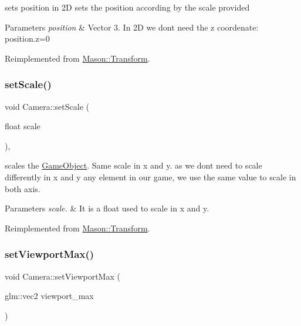sets position in 2D sets the position according by the scale provided 


\begin{DoxyParams}{Parameters}
{\em position} & Vector 3. In 2D we don\textquotesingle{}t need the z coordenate\+: position.\+z=0 \\
\hline
\end{DoxyParams}


Reimplemented from \hyperlink{class_mason_1_1_transform_a740f389e20c0190c52bcb893aeaa0490}{Mason\+::\+Transform}.

\hypertarget{class_mason_1_1_camera_af7aa6752699108d282996199549a704b}{}\label{class_mason_1_1_camera_af7aa6752699108d282996199549a704b} 
\subsubsection{\texorpdfstring{set\+Scale()}{setScale()}}
{\footnotesize\ttfamily void Camera\+::set\+Scale (\begin{DoxyParamCaption}\item[{float}]{scale }\end{DoxyParamCaption})\hspace{0.3cm}{\ttfamily [override]}, {\ttfamily [virtual]}}



scales the \hyperlink{class_mason_1_1_game_object}{Game\+Object}. Same scale in x and y. as we don\textquotesingle{}t need to scale differently in x and y any element in our game, we use the same value to scale in both axis. 


\begin{DoxyParams}{Parameters}
{\em scale.} & It is a float used to scale in x and y. \\
\hline
\end{DoxyParams}


Reimplemented from \hyperlink{class_mason_1_1_transform_a498d685b66e2f73b88d3583ce55461c8}{Mason\+::\+Transform}.

\hypertarget{class_mason_1_1_camera_a1f9a7896bb617d1402e3c4738324e1ea}{}\label{class_mason_1_1_camera_a1f9a7896bb617d1402e3c4738324e1ea} 
\subsubsection{\texorpdfstring{set\+Viewport\+Max()}{setViewportMax()}}
{\footnotesize\ttfamily void Camera\+::set\+Viewport\+Max (\begin{DoxyParamCaption}\item[{glm\+::vec2}]{viewport\+\_\+max }\end{DoxyParamCaption})}

